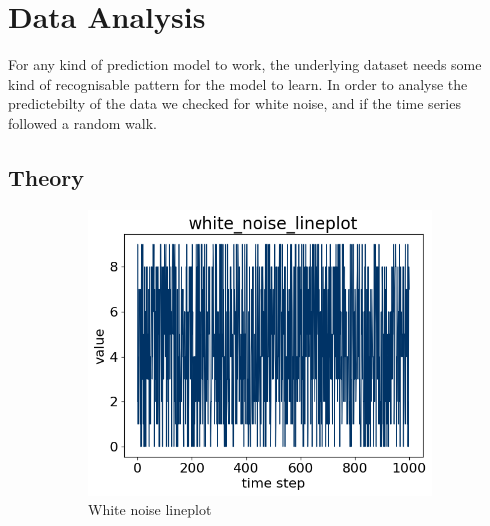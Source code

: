 \section{Data Analysis}
\label{section:Data:DataAnalysis}

For any kind of prediction model to work, the underlying dataset needs some kind of recognisable pattern for
the model to learn.
In order to analyse the predictebilty of the data we checked for white noise, and if the time series followed a random walk.

\subsection*{Theory}

\begin{figure}[H]
  \centering
  \caption{Syntetic data, noise and random values.}
  \label{fig:dataset:white_noise_random_wald}
  \begin{subfigure}[b]{0.4\textwidth}
    \includegraphics[width=\textwidth]{./figs/code_generated/data_exploration/white_noise_lineplot.png}
    \hfill
    \caption{White noise lineplot}
    \label{fig:dataset:white_noise}
  \end{subfigure}
  \begin{subfigure}[b]{0.4\textwidth}

\end{subfigure}
\end{figure}
